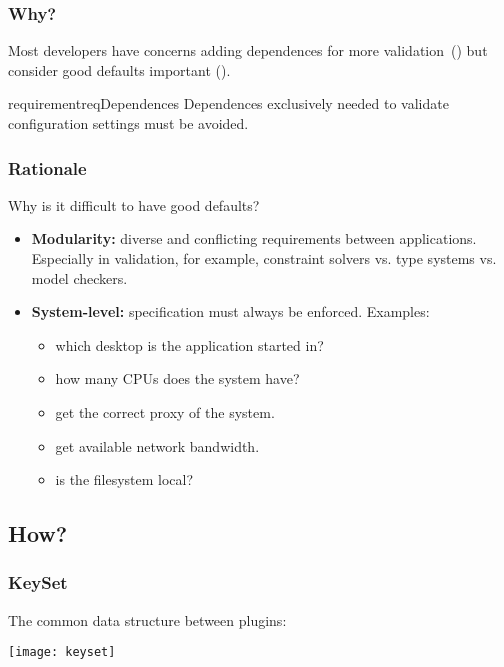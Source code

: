 \begin{frame}
	\frametitle{Why?}
	\begin{finding}
	\methodQuestion{}
	Most developers have concerns adding dependences for more validation~() but consider good defaults important ().
	\end{finding}

	\begin{restatable}{requirement}{reqDependences}
	\label{req:dependences}
	Dependences exclusively needed to validate configuration settings must be avoided.
	\end{restatable}
\end{frame}

\begin{frame}
	\frametitle{Rationale}
	Why is it difficult to have good defaults?
	\begin{itemize}[<+->]
	\item \textbf{Modularity:} diverse and conflicting requirements between applications.
	Especially in validation, for example, \linebreak
	constraint solvers vs. type systems vs. model checkers.
	\item \textbf{System-level:} specification must always be enforced. Examples:
	\begin{itemize}[<+-| alert@+>]
	\item which desktop is the application started in?
	\item how many CPUs does the system have?
	\item get the correct proxy of the system.
	\item get available network bandwidth.
	\item is the filesystem local?
	\end{itemize}
	\end{itemize}
\end{frame}

\subsection{How?}

\begin{frame}
	\Large
\end{frame}

\begin{frame}
	\frametitle{KeySet}

	The common data structure between plugins:
	\vspace{1cm}

	\texttt{[image: keyset]}
\end{frame}

